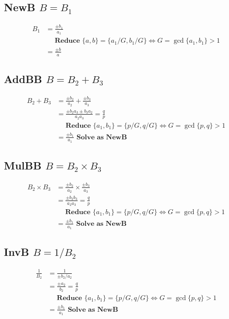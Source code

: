 \documentclass{article}
\begin{document}
\subsection{NewB $B = B_1$}
\begin{align}
B_1 &= \frac{\pm b_1}{a_1}\\
 &\quad \textbf{ Reduce } \{ a,b \} = \{a_1/G,b_1/G\} \iff G = \gcd \{a_1,b_1\} > 1 \nonumber \\
 &= \frac{\pm b}{a}
\end{align}

\subsection{AddBB $B = B_2 + B_3$}
\begin{align}
B_2 + B_3 &= \frac{\pm b_2}{a_2} + \frac{\pm b_3}{a_3} \\
 &= \frac{\pm b_2a_3 \pm b_3a_2 }{a_2a_3} = \frac{q}{p} \\
 &\quad \textbf{ Reduce } \{ a_1,b_1 \} = \{p/G, q/G\} \iff G = \gcd \{ p,q \} > 1 \nonumber \\
 &= \frac{\pm b_1 }{ a_1 } \textbf{ Solve as NewB }
\end{align}

\subsection{MulBB $B = B_2 \times B_3$}
\begin{align}
B_2 \times B_3 &= \frac{\pm b_2}{a_2} \times \frac{\pm b_3}{a_3} \\
  &= \frac{\pm b_2b_3}{a_2a_3} = \frac{q}{p} \\
 &\quad \textbf{ Reduce } \{ a_1,b_1 \} = \{p/G, q/G\} \iff G = \gcd \{ p,q \} > 1 \nonumber \\
 &= \frac{\pm b_1 }{ a_1 } \textbf{ Solve as NewB }
\end{align}

\subsection{InvB $B = 1 / B_2$}
\begin{align}
\frac{1}{B_2} &= \frac{1}{\pm b_2 / a_2}\\
 &= \frac{\pm a_2}{b_2} = \frac{q}{p} \\
 &\quad \textbf{ Reduce } \{ a_1,b_1 \} = \{p/G, q/G\} \iff G = \gcd \{ p,q \} > 1 \nonumber \\
 &= \frac{\pm b_1 }{ a_1 } \textbf{ Solve as NewB }
\end{align}
\end{document}
